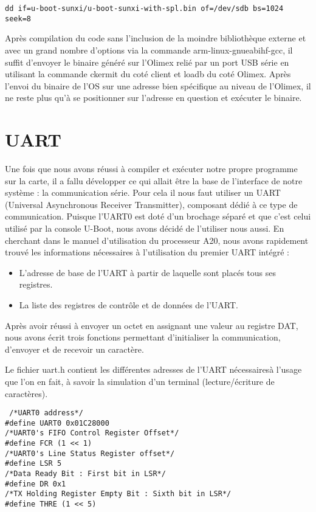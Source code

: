 \documentclass[frenchb]{article}
\begin{document}
\begin{verbatim}
dd if=u-boot-sunxi/u-boot-sunxi-with-spl.bin of=/dev/sdb bs=1024 seek=8
\end{verbatim}

Après compilation du code sans l'inclusion de la moindre bibliothèque externe et avec un grand nombre d'options via la commande \textsf{arm-linux-gnueabihf-gcc}, il suffit d'envoyer le binaire généré sur l'Olimex relié par un port USB série en utilisant la commande ckermit du coté client et loadb du coté Olimex.
Après l'envoi du binaire de l'OS sur une adresse bien spécifique au niveau de l'Olimex, il ne reste plus qu'à se positionner sur l'adresse en question et exécuter le binaire.

\section{UART}
Une fois que nous avons réussi à compiler et exécuter notre propre programme sur la carte, il a fallu développer ce qui allait être la base de l'interface de notre système : la communication série.
Pour cela il nous faut utiliser un UART (Universal Asynchronous Receiver Transmitter), composant dédié à ce type de communication.
Puisque l'UART0 est doté d'un brochage séparé et que c'est celui utilisé par la console U-Boot, nous avons décidé de l'utiliser nous aussi.
En cherchant dans le manuel d'utilisation du processeur A20, nous avons rapidement trouvé les informations nécessaires à l'utilisation du premier UART intégré :
\begin{itemize}
\item L'adresse de base de l'UART à partir de laquelle sont placés tous ses registres.
\item La liste des registres de contrôle et de données de l'UART.
\end{itemize}
Après avoir réussi à envoyer un octet en assignant une valeur au registre DAT, nous avons écrit trois fonctions permettant d'initialiser la communication, d'envoyer et de recevoir un caractère.

Le fichier \textsf{uart.h} contient les différentes adresses de l'UART nécessairesà l'usage que l'on en fait, à savoir la simulation d'un terminal (lecture/écriture de caractères).

\begin{lstlisting}
 /*UART0 address*/
#define UART0 0x01C28000
/*UART0's FIFO Control Register Offset*/
#define FCR (1 << 1)
/*UART0's Line Status Register offset*/
#define LSR 5
/*Data Ready Bit : First bit in LSR*/
#define DR 0x1
/*TX Holding Register Empty Bit : Sixth bit in LSR*/
#define THRE (1 << 5)
\end{lstlisting}
\vspace*{-0.8cm}
\end{document}
